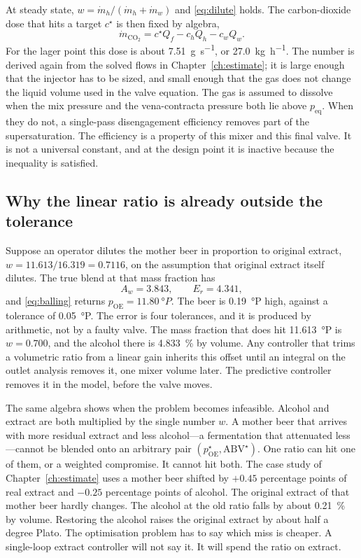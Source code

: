 At steady state, $w=\dot m_h/(\dot m_h+\dot m_w)$ and \eqref{eq:dilute} holds. The carbon-dioxide dose that hits a target $c^{\star}$ is then fixed by algebra,
\begin{equation}
\label{eq:dosess}
\dot m_{\mathrm{CO_2}}
=
c^{\star}Q_f - c_h Q_h - c_w Q_w.
\end{equation}
For the lager point this dose is about \SI{7.51}{\gram\per\second}, or \SI{27.0}{\kilogram\per\hour}. The number is derived again from the solved flows in Chapter~\ref{ch:estimate}; it is large enough that the injector has to be sized, and small enough that the gas does not change the liquid volume used in the valve equation. The gas is assumed to dissolve when the mix pressure and the vena-contracta pressure both lie above $p_{\mathrm{eq}}$. When they do not, a single-pass disengagement efficiency removes part of the supersaturation. The efficiency is a property of this mixer and this final valve. It is not a universal constant, and at the design point it is inactive because the inequality is satisfied.

\subsection{Why the linear ratio is already outside the tolerance}

Suppose an operator dilutes the mother beer in proportion to original extract, $w = 11.613/16.319 = 0.7116$, on the assumption that original extract itself dilutes. The true blend at that mass fraction has
\[
A_w = 3.843,
\qquad
E_r = 4.341,
\]
and \eqref{eq:balling} returns $p_{\mathrm{OE}} = \SI{11.80}{\degree}P$. The beer is \SI{0.19}{\degree}P high, against a tolerance of \SI{0.05}{\degree}P. The error is four tolerances, and it is produced by arithmetic, not by a faulty valve. The mass fraction that does hit \SI{11.613}{\degree}P is $w=0.700$, and the alcohol there is \SI{4.833}{\percent} by volume. Any controller that trims a volumetric ratio from a linear gain inherits this offset until an integral on the outlet analysis removes it, one mixer volume later. The predictive controller removes it in the model, before the valve moves.

The same algebra shows when the problem becomes infeasible. Alcohol and extract are both multiplied by the single number $w$. A mother beer that arrives with more residual extract and less alcohol---a fermentation that attenuated less---cannot be blended onto an arbitrary pair $(p_{\mathrm{OE}}^{\star},\mathrm{ABV}^{\star})$. One ratio can hit one of them, or a weighted compromise. It cannot hit both. The case study of Chapter~\ref{ch:estimate} uses a mother beer shifted by $+0.45$ percentage points of real extract and $-0.25$ percentage points of alcohol. The original extract of that mother beer hardly changes. The alcohol at the old ratio falls by about \SI{0.21}{\percent} by volume. Restoring the alcohol raises the original extract by about half a degree Plato. The optimisation problem has to say which miss is cheaper. A single-loop extract controller will not say it. It will spend the ratio on extract.

